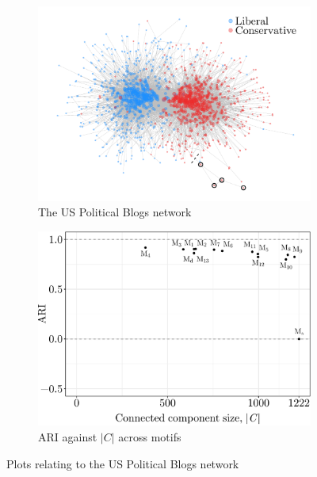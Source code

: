 \vspace*{0.5cm}
\begin{figure}[H]
	\begin{subfigure}{.49\textwidth}
		\centering
		\includegraphics[scale=0.4,draft=false]{../../results/polblogs/polblogs_network.pdf}
		\caption{The US Political Blogs network}
		\label{fig:polblogs_network}
	\end{subfigure}
	\begin{subfigure}{.49\textwidth}
		\centering
		\includegraphics[scale=0.4,draft=false]{../../results/polblogs/polblogs_ari_conn.pdf}
		\caption{ARI against $|C|$ across motifs}
		\label{fig:polblogs_ariplot}
	\end{subfigure}
	\caption{Plots relating to the US Political Blogs network}
\end{figure}


